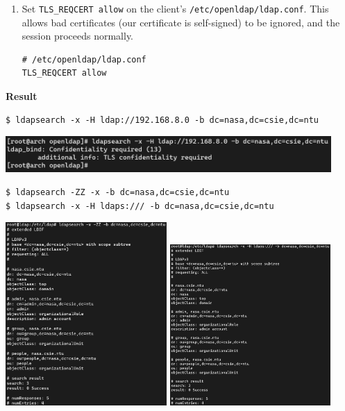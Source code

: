 \documentclass[12pt, a4paper]{article}
\begin{document}
\begin{enumerate}[label=(\alph*)]
\begin{enumerate}[label=(\arabic*)]
      \item Set \verb|TLS_REQCERT allow| on the client's \verb|/etc/openldap/ldap.conf|.
      This allows bad certificates (our certificate is self-signed) to be ignored, and the
      session proceeds normally.
      \begin{Verbatim}[frame=single]
# /etc/openldap/ldap.conf
TLS_REQCERT allow
      \end{Verbatim}
    \end{enumerate}

    \textbf{Result}
    \begin{Verbatim}[frame=single]
$ ldapsearch -x -H ldap://192.168.8.0 -b dc=nasa,dc=csie,dc=ntu
    \end{Verbatim}

    \includegraphics[width=0.93\textwidth]{2-b_ldapsearch_denied.png}

    \begin{Verbatim}[frame=single]
$ ldapsearch -ZZ -x -b dc=nasa,dc=csie,dc=ntu
$ ldapsearch -x -H ldaps:/// -b dc=nasa,dc=csie,dc=ntu
    \end{Verbatim}

    \includegraphics[width=0.46\textwidth]{1-b_ldapsearch_starttls.png}
    \includegraphics[width=0.46\textwidth]{1-b_ldapsearch_ldaps.png}


\end{enumerate}
\end{document}
